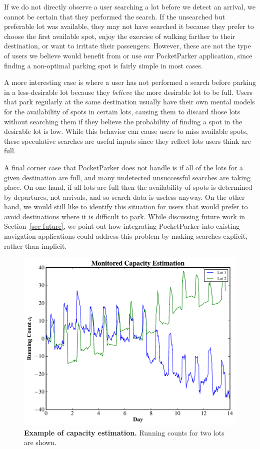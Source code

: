 If we do not directly observe a user searching a lot before we detect an
arrival, we cannot be certain that they performed the search. If the
unsearched but preferable lot was available, they may not have searched it
because they prefer to choose the first available spot, enjoy the exercise of
walking farther to their destination, or want to irritate their passengers.
However, these are not the type of users we believe would benefit from or use
our PocketParker application, since finding a non-optimal parking spot is
fairly simple in most cases.

A more interesting case is where a user has not performed a search before
parking in a less-desirable lot because they \textit{believe} the more
desirable lot to be full. Users that park regularly at the same destination
usually have their own mental models for the availability of spots in certain
lots, causing them to discard those lots without searching them if they
believe the probability of finding a spot in the desirable lot is low. While
this behavior can cause users to miss available spots, these speculative
searches are useful inputs since they reflect lots users think are full.

A final corner case that PocketParker does not handle is if all of the lots
for a given destination are full, and many undetected unsuccessful searches
are taking place. On one hand, if all lots are full then the availability of
spots is determined by departures, not arrivals, and so search data is
useless anyway. On the other hand, we would still like to identify this
situation for users that would prefer to avoid destinations where it is
difficult to park. While discussing future work in Section~\ref{sec-future},
we point out how integrating PocketParker into existing navigation
applications could address this problem by making searches explicit, rather
than implicit.

\begin{figure}
\centering
\includegraphics[width=\columnwidth]{./simulator/figures/capacity.pdf}

\caption{\textbf{Example of capacity estimation.} Running counts for two lots
are shown.}

\label{fig-capacityexample}
\end{figure}

